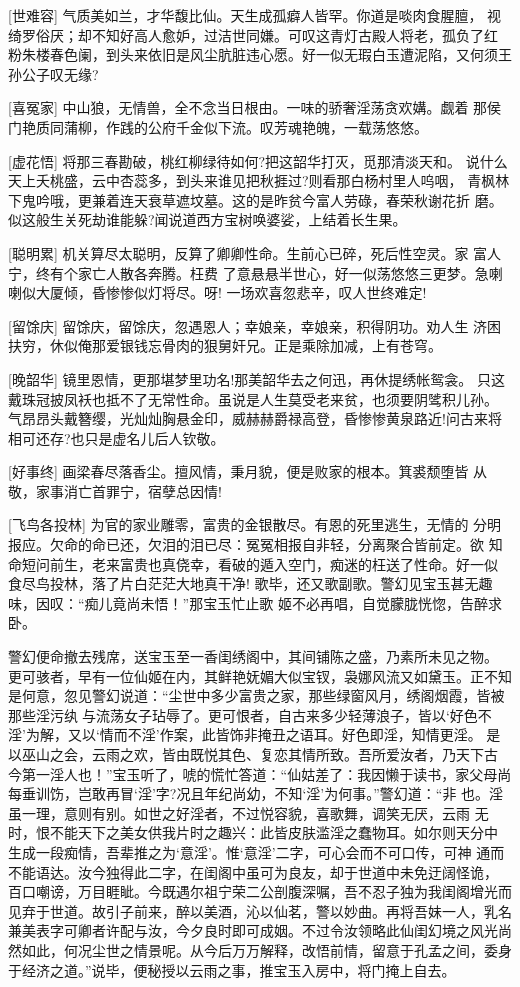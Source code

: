 [世难容]
气质美如兰，才华馥比仙。天生成孤癖人皆罕。你道是啖肉食腥膻，
视绮罗俗厌；却不知好高人愈妒，过洁世同嫌。可叹这青灯古殿人将老，孤负了红
粉朱楼春色阑，到头来依旧是风尘肮脏违心愿。好一似无瑕白玉遭泥陷，又何须王
孙公子叹无缘?

[喜冤家]
中山狼，无情兽，全不念当日根由。一味的骄奢淫荡贪欢媾。觑着
那侯门艳质同蒲柳，作践的公府千金似下流。叹芳魂艳魄，一载荡悠悠。

[虚花悟]
将那三春勘破，桃红柳绿待如何?把这韶华打灭，觅那清淡天和。
说什么天上夭桃盛，云中杏蕊多，到头来谁见把秋捱过?则看那白杨村里人呜咽，
青枫林下鬼吟哦，更兼着连天衰草遮坟墓。这的是昨贫今富人劳碌，春荣秋谢花折
磨。似这般生关死劫谁能躲?闻说道西方宝树唤婆娑，上结着长生果。

[聪明累]
机关算尽太聪明，反算了卿卿性命。生前心已碎，死后性空灵。家
富人宁，终有个家亡人散各奔腾。枉费
了意悬悬半世心，好一似荡悠悠三更梦。急喇喇似大厦倾，昏惨惨似灯将尽。呀!
一场欢喜忽悲辛，叹人世终难定!

[留馀庆]
留馀庆，留馀庆，忽遇恩人；幸娘亲，幸娘亲，积得阴功。劝人生
济困扶穷，休似俺那爱银钱忘骨肉的狠舅奸兄。正是乘除加减，上有苍穹。

[晚韶华]
镜里恩情，更那堪梦里功名!那美韶华去之何迅，再休提绣帐鸳衾。
只这戴珠冠披凤袄也抵不了无常性命。虽说是人生莫受老来贫，也须要阴骘积儿孙。
气昂昂头戴簪缨，光灿灿胸悬金印，威赫赫爵禄高登，昏惨惨黄泉路近!问古来将
相可还存?也只是虚名儿后人钦敬。

[好事终]
画梁春尽落香尘。擅风情，秉月貌，便是败家的根本。箕裘颓堕皆
从敬，家事消亡首罪宁，宿孽总因情!

[飞鸟各投林]
为官的家业雕零，富贵的金银散尽。有恩的死里逃生，无情的
分明报应。欠命的命已还，欠泪的泪已尽：冤冤相报自非轻，分离聚合皆前定。欲
知命短问前生，老来富贵也真侥幸，看破的遁入空门，痴迷的枉送了性命。好一似
食尽鸟投林，落了片白茫茫大地真干净!
歌毕，还又歌副歌。警幻见宝玉甚无趣味，因叹：“痴儿竟尚未悟！”那宝玉忙止歌
姬不必再唱，自觉朦胧恍惚，告醉求卧。

警幻便命撤去残席，送宝玉至一香闺绣阁中，其间铺陈之盛，乃素所未见之物。
更可骇者，早有一位仙姬在内，其鲜艳妩媚大似宝钗，袅娜风流又如黛玉。正不知
是何意，忽见警幻说道：“尘世中多少富贵之家，那些绿窗风月，绣阁烟霞，皆被
那些淫污纨与流荡女子玷辱了。更可恨者，自古来多少轻薄浪子，皆以‘好色不
淫’为解，又以‘情而不淫’作案，此皆饰非掩丑之语耳。好色即淫，知情更淫。
是以巫山之会，云雨之欢，皆由既悦其色、复恋其情所致。吾所爱汝者，乃天下古
今第一淫人也！”宝玉听了，唬的慌忙答道：“仙姑差了：我因懒于读书，家父母尚
每垂训饬，岂敢再冒‘淫’字?况且年纪尚幼，不知‘淫’为何事。”警幻道：“非
也。淫虽一理，意则有别。如世之好淫者，不过悦容貌，喜歌舞，调笑无厌，云雨
无时，恨不能天下之美女供我片时之趣兴：此皆皮肤滥淫之蠢物耳。如尔则天分中
生成一段痴情，吾辈推之为‘意淫’。惟‘意淫’二字，可心会而不可口传，可神
通而不能语达。汝今独得此二字，在闺阁中虽可为良友，却于世道中未免迂阔怪诡，
百口嘲谤，万目睚眦。今既遇尔祖宁荣二公剖腹深嘱，吾不忍子独为我闺阁增光而
见弃于世道。故引子前来，醉以美酒，沁以仙茗，警以妙曲。再将吾妹一人，乳名
兼美表字可卿者许配与汝，今夕良时即可成姻。不过令汝领略此仙闺幻境之风光尚
然如此，何况尘世之情景呢。从今后万万解释，改悟前情，留意于孔孟之间，委身
于经济之道。”说毕，便秘授以云雨之事，推宝玉入房中，将门掩上自去。

